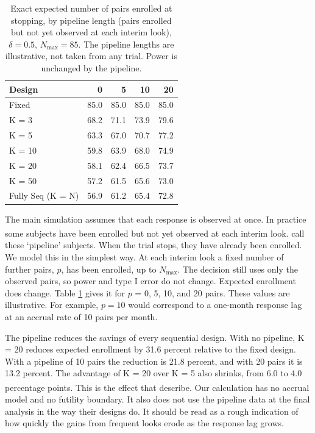 \documentclass[
  11pt,
]{article}
\begin{document}
\begin{table}[!h]
\centering
\caption{\label{tab:pipeline-table}Exact expected number of pairs enrolled at stopping, by pipeline length (pairs enrolled but not yet observed at each interim look), $\delta = 0.5$, $N_{\max} = 85$. The pipeline lengths are illustrative, not taken from any trial. Power is unchanged by the pipeline.}
\centering
\fontsize{9}{11}\selectfont
\begin{tabular}[t]{lrrrr}
\toprule
Design & 0 & 5 & 10 & 20\\
\midrule
Fixed & 85.0 & 85.0 & 85.0 & 85.0\\
K = 3 & 68.2 & 71.1 & 73.9 & 79.6\\
K = 5 & 63.3 & 67.0 & 70.7 & 77.2\\
K = 10 & 59.8 & 63.9 & 68.0 & 74.9\\
K = 20 & 58.1 & 62.4 & 66.5 & 73.7\\
\addlinespace
K = 50 & 57.2 & 61.5 & 65.6 & 73.0\\
Fully Seq (K = N) & 56.9 & 61.2 & 65.4 & 72.8\\
\bottomrule
\end{tabular}
\end{table}

The main simulation assumes that each response is
observed at once. In practice some subjects have been
enrolled but not yet observed at each interim look.\textsuperscript{} call these `pipeline' subjects.
When the trial stops, they have already been enrolled.
We model this in the simplest way. At each interim look
a fixed number of further pairs, \(p\), has been
enrolled, up to \(N_{\max}\). The decision still uses only
the observed pairs, so power and type I error do not
change. Expected enrollment does change. Table
\ref{tab:pipeline-table} gives it for \(p\) = 0, 5, 10,
and 20 pairs. These values are illustrative. For
example, \(p = 10\) would correspond to a one-month
response lag at an accrual rate of 10 pairs per month.

The pipeline reduces the savings of every sequential
design. With no pipeline, K = 20 reduces expected
enrollment by
31.6 percent relative to
the fixed design. With a pipeline of 10 pairs the
reduction is 21.8
percent, and with 20 pairs it is
13.2 percent. The
advantage of K = 20 over K = 5 also shrinks, from
6.0
to
4.0
percentage points. This is the effect that\textsuperscript{} describe. Our calculation has no
accrual model and no futility boundary. It also does
not use the pipeline data at the final analysis in the
way their designs do. It should be read as a rough
indication of how quickly the gains from frequent
looks erode as the response lag grows.
\end{document}
